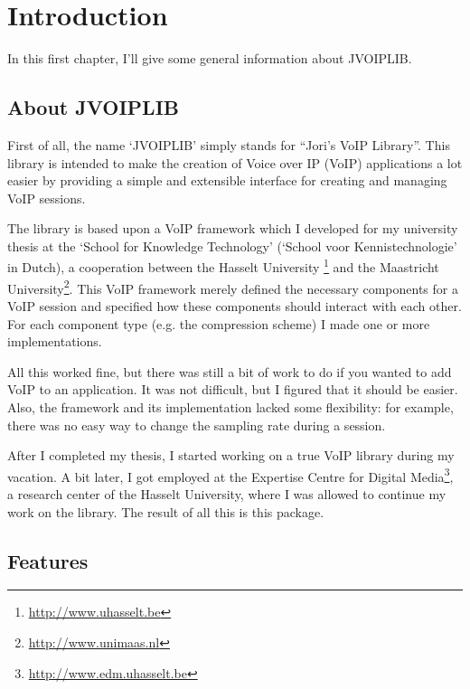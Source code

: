 \chapter{Introduction}

In this first chapter, I'll give some general information about JVOIPLIB.

	\section{About JVOIPLIB}

	First of all, the name `JVOIPLIB' simply stands for ``Jori's VoIP Library''.
	This library is intended to make the creation of Voice over IP (VoIP)
	applications a lot easier by providing a simple and extensible interface
	for creating and managing VoIP sessions.

	The library is based upon a VoIP framework which I developed for my
	university thesis at the `School for Knowledge Technology' (`School
	voor Kennistechnologie' in Dutch), a cooperation between the Hasselt
	University \footnote{\url{http://www.uhasselt.be}} and the
	Maastricht University\footnote{\url{http://www.unimaas.nl}}.
	This VoIP framework merely defined the necessary components for a VoIP
	session and specified how these components should interact with each
	other. For each component type (e.g. the compression scheme) I made one
	or more implementations.

	All this worked fine, but there was still a bit of work to do if you wanted
	to add VoIP to an application. It was not difficult, but I figured that
	it should be easier. Also, the framework and its implementation lacked some
	flexibility: for example, there was no easy way to change the sampling rate
	during a session.
	
	After I completed my thesis, I started working on a true VoIP library during
	my vacation. A bit later, I got employed at the Expertise Centre for Digital
	Media\footnote{\url{http://www.edm.uhasselt.be}}, a research center of the 
	Hasselt University, where I was allowed to continue my work on the library. 
	The result of all this is this package.
	
	\section{Features}
	
